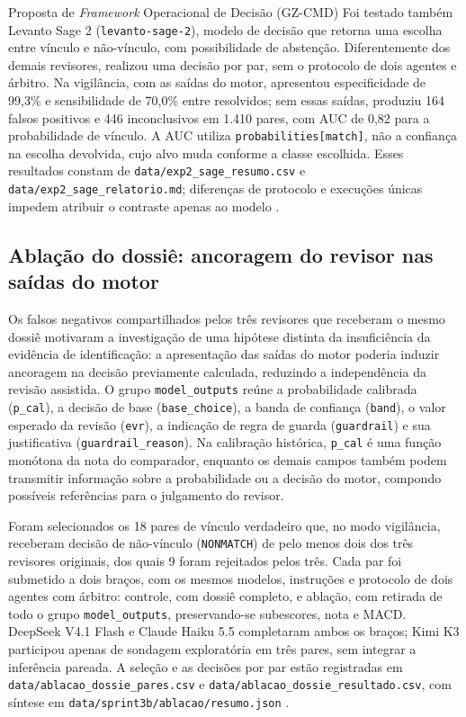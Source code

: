 \begin{chapter}{Proposta de \textit{Framework} Operacional de Decisão (GZ-CMD)}
Foi testado também Levanto Sage 2 (\texttt{levanto-sage-2}), modelo de decisão que retorna uma escolha entre vínculo e não-vínculo, com possibilidade de abstenção. Diferentemente dos demais revisores, realizou uma decisão por par, sem o protocolo de dois agentes e árbitro. Na vigilância, com as saídas do motor, apresentou especificidade de 99,3\% e sensibilidade de 70,0\% entre resolvidos; sem essas saídas, produziu 164 falsos positivos e 446 inconclusivos em 1.410 pares, com AUC de 0,82 para a probabilidade de vínculo. A AUC utiliza \texttt{probabilities[match]}, não a confiança na escolha devolvida, cujo alvo muda conforme a classe escolhida. Esses resultados constam de \texttt{data/exp2\_sage\_resumo.csv} e \texttt{data/exp2\_sage\_relatorio.md}; diferenças de protocolo e execuções únicas impedem atribuir o contraste apenas ao modelo \cite{Jardim2026phdrepo}.

\subsection{Ablação do dossiê: ancoragem do revisor nas saídas do motor}
\label{sec:cap8-ablacao-dossie}

Os falsos negativos compartilhados pelos três revisores que receberam o mesmo dossiê motivaram a investigação de uma hipótese distinta da insuficiência da evidência de identificação: a apresentação das saídas do motor poderia induzir ancoragem na decisão previamente calculada, reduzindo a independência da revisão assistida. O grupo \texttt{model\_outputs} reúne a probabilidade calibrada (\texttt{p\_cal}), a decisão de base (\texttt{base\_choice}), a banda de confiança (\texttt{band}), o valor esperado da revisão (\texttt{evr}), a indicação de regra de guarda (\texttt{guardrail}) e sua justificativa (\texttt{guardrail\_reason}). Na calibração histórica, \texttt{p\_cal} é uma função monótona da nota do comparador, enquanto os demais campos também podem transmitir informação sobre a probabilidade ou a decisão do motor, compondo possíveis referências para o julgamento do revisor.

Foram selecionados os 18 pares de vínculo verdadeiro que, no modo vigilância, receberam decisão de não-vínculo (\texttt{NONMATCH}) de pelo menos dois dos três revisores originais, dos quais 9 foram rejeitados pelos três. Cada par foi submetido a dois braços, com os mesmos modelos, instruções e protocolo de dois agentes com árbitro: controle, com dossiê completo, e ablação, com retirada de todo o grupo \texttt{model\_outputs}, preservando-se subescores, nota e MACD. DeepSeek V4.1 Flash e Claude Haiku 5.5 completaram ambos os braços; Kimi K3 participou apenas de sondagem exploratória em três pares, sem integrar a inferência pareada. A seleção e as decisões por par estão registradas em \texttt{data/ablacao\_dossie\_pares.csv} e \texttt{data/ablacao\_dossie\_resultado.csv}, com síntese em \texttt{data/sprint3b/ablacao/resumo.json} \cite{Jardim2026phdrepo}.


\end{chapter}
